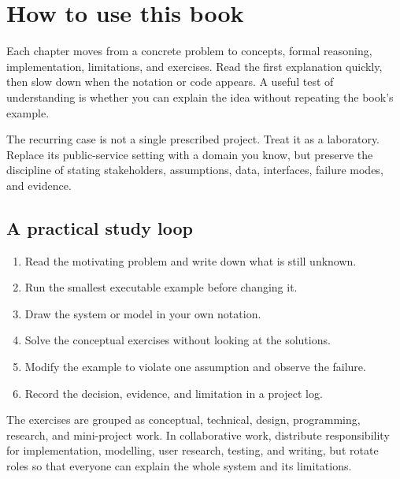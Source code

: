 \chapter*{How to use this book}

Each chapter moves from a concrete problem to concepts, formal reasoning, implementation, limitations, and exercises. Read the first explanation quickly, then slow down when the notation or code appears. A useful test of understanding is whether you can explain the idea without repeating the book's example.

The recurring case is not a single prescribed project. Treat it as a laboratory. Replace its public-service setting with a domain you know, but preserve the discipline of stating stakeholders, assumptions, data, interfaces, failure modes, and evidence.

\section*{A practical study loop}
\begin{enumerate}
\item Read the motivating problem and write down what is still unknown.
\item Run the smallest executable example before changing it.
\item Draw the system or model in your own notation.
\item Solve the conceptual exercises without looking at the solutions.
\item Modify the example to violate one assumption and observe the failure.
\item Record the decision, evidence, and limitation in a project log.
\end{enumerate}

The exercises are grouped as conceptual, technical, design, programming, research, and mini-project work. In collaborative work, distribute responsibility for implementation, modelling, user research, testing, and writing, but rotate roles so that everyone can explain the whole system and its limitations.

